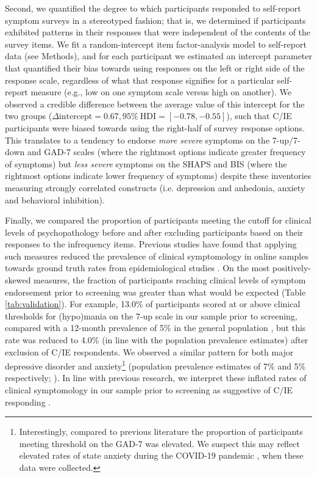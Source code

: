 \documentclass[a4paper,notitlepage,12pt]{article}
\begin{document}
\begin{refsection}[main]
Second, we quantified the degree to which participants responded to self-report symptom surveys in a stereotyped fashion; that is, we determined if participants exhibited patterns in their responses that were independent of the contents of the survey items. We fit a random-intercept item factor-analysis model \cite{maydeu2006random} to self-report data (see Methods), and for each participant we estimated an intercept parameter that quantified their bias towards using responses on the left or right side of the response scale, regardless of what that response signifies for a particular self-report measure (e.g., low on one symptom scale versus high on another). We observed a credible difference between the average value of this intercept for the two groups ($\Delta \text{intercept} = 0.67, 95\% \ \text{HDI} = [-0.78, -0.55]$), such that C/IE participants were biased towards using the right-half of survey response options. This translates to a tendency to endorse \emph{more severe} symptoms on the 7-up/7-down and GAD-7 scales (where the rightmost options indicate greater frequency of symptoms) but \emph{less severe} symptoms on the SHAPS and BIS (where the rightmost options indicate lower frequency of symptoms) despite these inventories measuring strongly correlated constructs (i.e. depression and anhedonia, anxiety and behavioral inhibition).

Finally, we compared the proportion of participants meeting the cutoff for clinical levels of psychopathology before and after excluding participants based on their responses to the infrequency items. Previous studies have found that applying such measures reduced the prevalence of clinical symptomology in online samples towards ground truth rates from epidemiological studies \cite{ophir2020turker}. On the most positively-skewed measures, the fraction of participants reaching clinical levels of symptom endorsement prior to screening was greater than what would be expected (Table \ref{tab:validation}). For example, 13.0\% of participants scored at or above clinical thresholds for (hypo)mania on the 7-up scale in our sample prior to screening, compared with a 12-month prevalence of 5\% in the general population \cite{merikangas2007lifetime, merikangas2012true}, but this rate was reduced to 4.0\% (in line with the population prevalence estimates) after exclusion of C/IE respondents. We observed a similar pattern for both major depressive disorder and anxiety\footnote{Interestingly, compared to previous literature the proportion of participants meeting threshold on the GAD-7 was elevated. We suspect this may reflect elevated rates of state anxiety during the COVID-19 pandemic \cite{yarrington2021impact}, when these data were collected.} (population prevalence estimates of 7\% and 5\% respectively; \cite{kessler2012twelve, lowe2008validation, hinz2017psychometric}).  In line with previous research, we interpret these inflated rates of clinical symptomology in our sample prior to screening as suggestive of C/IE responding \cite{ophir2020turker}.


\end{refsection}
\end{document}
